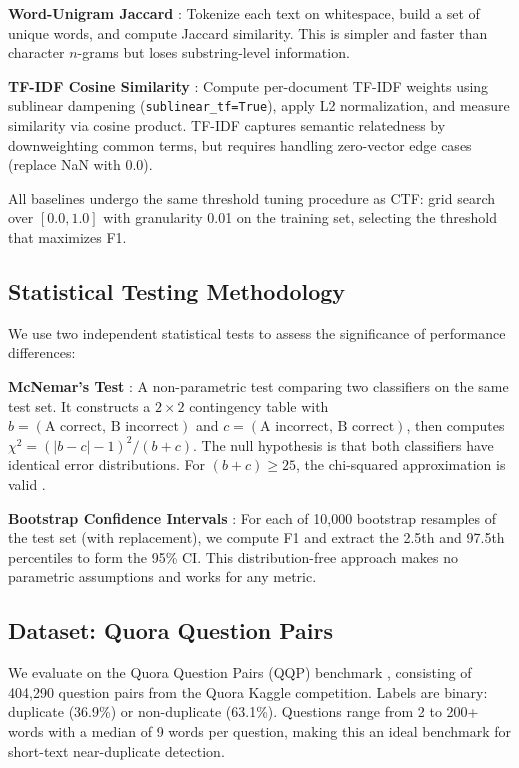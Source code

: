 \documentclass[11pt,letterpaper]{article}
\begin{document}
\textbf{Word-Unigram Jaccard} \citep{Broder1997, StanfordIR}: Tokenize each text on whitespace, build a set of unique words, and compute Jaccard similarity. This is simpler and faster than character $n$-grams but loses substring-level information.

\textbf{TF-IDF Cosine Similarity} \citep{ScikitLearnTfidf}: Compute per-document TF-IDF weights using sublinear dampening (\texttt{sublinear\_tf=True}), apply L2 normalization, and measure similarity via cosine product. TF-IDF captures semantic relatedness by downweighting common terms, but requires handling zero-vector edge cases (replace NaN with 0.0).

All baselines undergo the same threshold tuning procedure as CTF: grid search over $[0.0, 1.0]$ with granularity 0.01 on the training set, selecting the threshold that maximizes F1.

\subsection{Statistical Testing Methodology}

We use two independent statistical tests to assess the significance of performance differences:

\textbf{McNemar's Test} \citep{Mcnemar1947, Dietterich1998}: A non-parametric test comparing two classifiers on the same test set. It constructs a $2{\times}2$ contingency table with $b = (\text{A correct, B incorrect})$ and $c = (\text{A incorrect, B correct})$, then computes $\chi^2 = (|b - c| - 1)^2 / (b + c)$. The null hypothesis is that both classifiers have identical error distributions. For $(b + c) \geq 25$, the chi-squared approximation is valid \citep{Mcnemar1947, Dietterich1998}.

\textbf{Bootstrap Confidence Intervals} \citep{Efron1979, EfronTibshirani1993}: For each of 10,000 bootstrap resamples of the test set (with replacement), we compute F1 and extract the 2.5th and 97.5th percentiles to form the 95\% CI. This distribution-free approach makes no parametric assumptions and works for any metric.

\subsection{Dataset: Quora Question Pairs}

We evaluate on the Quora Question Pairs (QQP) benchmark \citep{Iyer2017}, consisting of 404,290 question pairs from the Quora Kaggle competition. Labels are binary: duplicate (36.9\%) or non-duplicate (63.1\%). Questions range from 2 to 200+ words with a median of 9 words per question, making this an ideal benchmark for short-text near-duplicate detection.
\end{document}
